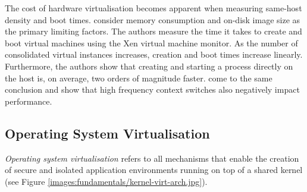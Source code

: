 The cost of hardware virtualisation becomes apparent when measuring same-host density
and boot times. \textcite{10.1145/3132747.3132763} consider memory consumption and on-disk image size
as the primary limiting factors. The authors measure the time it takes to create and boot
virtual machines using the Xen virtual machine monitor.
As the number of consolidated virtual instances increases, creation and boot times increase linearly. 
Furthermore, the authors show that creating and starting a process directly on the host is, on average, 
two orders of magnitude faster. \textcite{10.1145/2151024.2151030} come to the same conclusion and show
that high frequency context switches also negatively impact performance.

\subsection{Operating System Virtualisation}
\label{ch:fundamentals/virtualisation/os-virtualisation}
\textit{Operating system virtualisation} refers to all mechanisms that enable the creation of secure
and isolated application environments running on top of a shared kernel (see Figure \ref{images:fundamentals/kernel-virt-arch.jpg}). 

